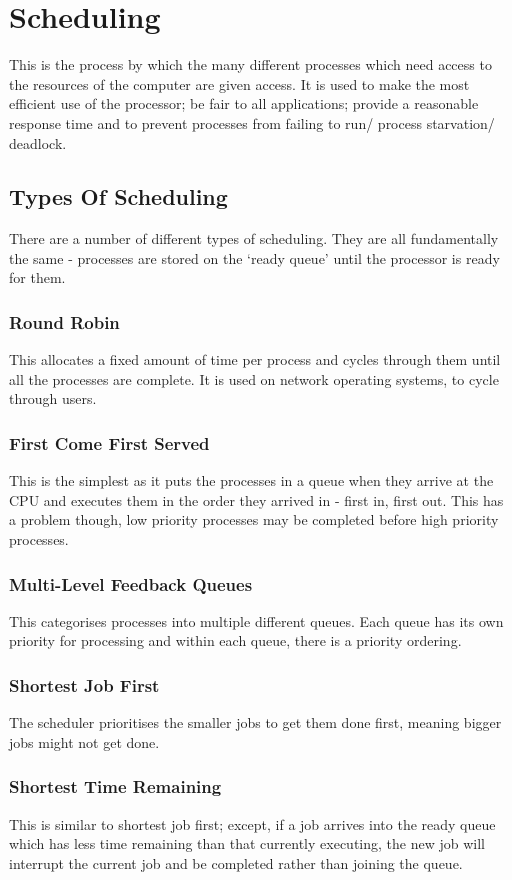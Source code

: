 \documentclass[a4paper,11pt, twocolumn]{article}
\begin{document}
\section{Scheduling}
This is the process by which the many different processes which need access to the resources of the computer are given access. It is used to make the most efficient use of the processor; be fair to all applications; provide a reasonable response time and to prevent processes from failing to run/ process starvation/ deadlock.
\subsection{Types Of Scheduling}
There are a number of different types of scheduling. They are all fundamentally the same - processes are stored on the `ready queue' until the processor is ready for them.
\subsubsection{Round Robin}
This allocates a fixed amount of time per process and cycles through them until all the processes are complete. It is used on network operating systems, to cycle through users.
\subsubsection{First Come First Served}
This is the simplest as it puts the processes in a queue when they arrive at the CPU and executes them in the order they arrived in - first in, first out. This has a problem though, low priority processes may be completed before high priority processes.
\subsubsection{Multi-Level Feedback Queues}
This categorises processes into multiple different queues. Each queue has its own priority for processing and within each queue, there is a priority ordering.
\subsubsection{Shortest Job First}
The scheduler prioritises the smaller jobs to get them done first, meaning bigger jobs might not get done. 
\subsubsection{Shortest Time Remaining}
This is similar to shortest job first; except, if a job arrives into the ready queue which has less time remaining than that currently executing, the new job will interrupt the current job and be completed rather than joining the queue.
\end{document}
